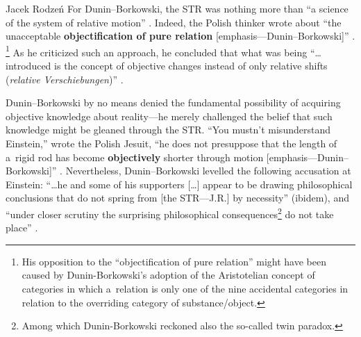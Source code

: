 \begin{artengenv}{Jacek Rodzeń}
For Dunin–Borkowski, the STR was nothing more than ``a science of the system of relative motion''
\parencite*[][p.213]{dunin-borkowski_neue_1921}. %
 Indeed, the Polish thinker wrote about ``the unacceptable \textbf{objectification of pure relation} [emphasis---Dunin–Borkowski]'' 
\parencite*[][pp.214–215]{dunin-borkowski_neue_1921}.%
\footnote{His opposition to the ``objectification of pure relation'' might have been caused by Dunin-Borkowski's adoption of the Aristotelian concept of categories in which a~relation is only one of the nine accidental categories in relation to the overriding category of substance/object.} As he criticized such an approach, he concluded that what was being ``…introduced is the concept of objective changes instead of only relative shifts (\textit{relative Verschiebungen})'' 
\parencite*[][p.214]{dunin-borkowski_neue_1921}.%


Dunin–Borkowski by no means denied the fundamental possibility of acquiring objective knowledge about reality---he merely challenged the belief that such knowledge might be gleaned through the STR. ``You mustn't misunderstand Einstein,'' wrote the Polish Jesuit, ``he does not presuppose that the length of a~rigid rod has become \textbf{objectively} shorter through motion [emphasis---Dunin–Borkowski]''
\parencite*[][p.212]{dunin-borkowski_neue_1921}. %
 Nevertheless, Dunin–Borkowski levelled the following accusation at Einstein: ``…he and some of his supporters […] appear to be drawing philosophical conclusions that do not spring from [the STR---J.R.] by necessity'' (ibidem), and ``under closer scrutiny the surprising philosophical consequences\footnote{Among which Dunin-Borkowski reckoned also the so-called twin paradox.} do not take place'' 
\parencite*[][p.215]{dunin-borkowski_neue_1921}.%



\end{artengenv}
